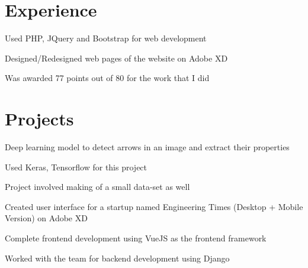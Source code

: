 \documentclass[]{deedy-resume-openfont}
\begin{document}
\hfill
\begin{minipage}[t]{0.66\textwidth} 


\section{Experience}
\vspace{\topsep} %
\begin{tightemize} 
\item Used PHP, JQuery and Bootstrap for web development
\item Designed/Redesigned web pages of the website on Adobe XD
\item Was awarded 77 points out of 80 for the work that I did
\end{tightemize}
\sectionsep


\section{Projects}
\begin{tightemize}
\item Deep learning model to detect arrows in an image and extract their properties
\item Used Keras, Tensorflow for this project
\item Project involved making of a small data-set as well
\end{tightemize}
\sectionsep

\descript{}
\begin{tightemize}
\item Created user interface for a startup named Engineering Times (Desktop + Mobile Version) on Adobe XD
\item Complete frontend development using VueJS as the frontend framework
\item Worked with the team for backend development using Django
\end{tightemize}
\sectionsep


\end{minipage}
\end{document}
